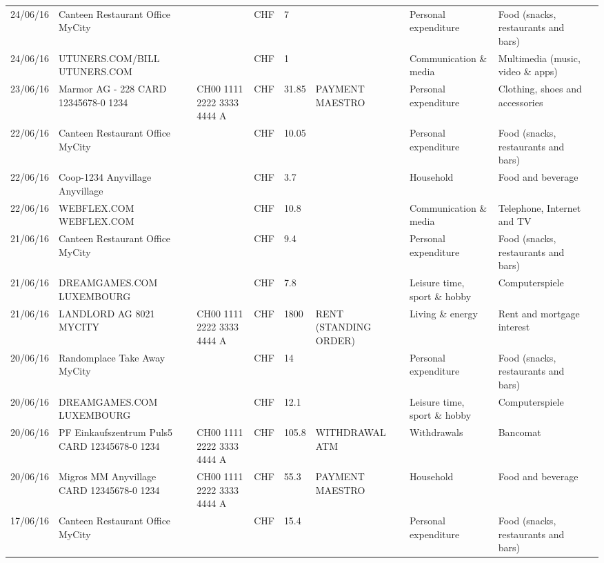 \begin{landscape}
\begin{tiny}
\begin{longtable}{lp{4cm}llllp{3cm}ll}
		    24/06/16 & Canteen Restaurant Office      MyCity &       & CHF   & 7     &       & Personal expenditure & Food (snacks, restaurants and bars) \\
		    24/06/16 & UTUNERS.COM/BILL          UTUNERS.COM &       & CHF   & 1     &       & Communication \& media & Multimedia (music, video \& apps) \\
		    23/06/16 & Marmor AG - 228 CARD 12345678-0 1234 & CH00 1111 2222 3333 4444 A & CHF   & 31.85 & PAYMENT MAESTRO & Personal expenditure & Clothing, shoes and accessories \\
		    22/06/16 & Canteen Restaurant Office      MyCity &       & CHF   & 10.05 &       & Personal expenditure & Food (snacks, restaurants and bars) \\
		    22/06/16 & Coop-1234 Anyvillage    Anyvillage &       & CHF   & 3.7   &       & Household & Food and beverage \\
		    22/06/16 & WEBFLEX.COM              WEBFLEX.COM &       & CHF   & 10.8  &       & Communication \& media & Telephone,  Internet and TV \\
		    21/06/16 & Canteen Restaurant Office      MyCity &       & CHF   & 9.4   &       & Personal expenditure & Food (snacks, restaurants and bars) \\
		    21/06/16 & DREAMGAMES.COM           LUXEMBOURG &       & CHF   & 7.8   &       & Leisure time, sport \& hobby & Computerspiele \\
		    21/06/16 & LANDLORD AG 8021 MYCITY & CH00 1111 2222 3333 4444 A & CHF   & 1800  & RENT (STANDING ORDER) & Living \& energy & Rent and mortgage interest \\
		    20/06/16 & Randomplace Take Away     MyCity &       & CHF   & 14    &       & Personal expenditure & Food (snacks, restaurants and bars) \\
		    20/06/16 & DREAMGAMES.COM           LUXEMBOURG &       & CHF   & 12.1  &       & Leisure time, sport \& hobby & Computerspiele \\
		    20/06/16 & PF Einkaufszentrum Puls5 CARD 12345678-0 1234 & CH00 1111 2222 3333 4444 A & CHF   & 105.8 & WITHDRAWAL ATM & Withdrawals & Bancomat \\
		    20/06/16 & Migros MM Anyvillage CARD 12345678-0 1234 & CH00 1111 2222 3333 4444 A & CHF   & 55.3  & PAYMENT MAESTRO & Household & Food and beverage \\
		    17/06/16 & Canteen Restaurant Office      MyCity &       & CHF   & 15.4  &       & Personal expenditure & Food (snacks, restaurants and bars) \\

\end{longtable}
\end{tiny}
\end{landscape}
